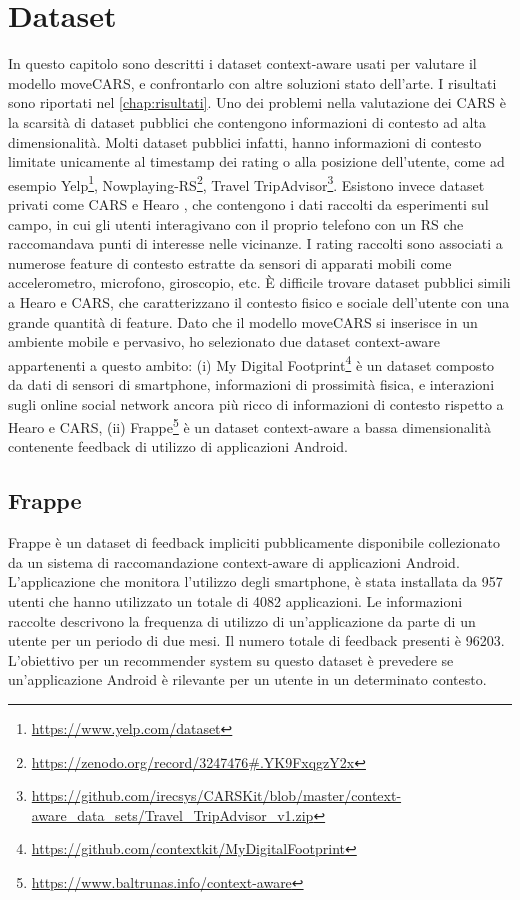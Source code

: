 \documentclass[12pt,italian]{report}
\begin{document}
\chapter{Dataset} \label{chap:datasets}
In questo capitolo sono descritti i dataset context-aware usati per valutare il modello moveCARS, e confrontarlo con altre soluzioni stato dell'arte. I risultati sono riportati nel \autoref{chap:risultati}. Uno dei problemi nella valutazione dei CARS è la scarsità di dataset pubblici che contengono informazioni di contesto ad alta dimensionalità. Molti dataset pubblici infatti, hanno informazioni di contesto limitate unicamente al timestamp dei rating o alla posizione dell'utente, come ad esempio Yelp\footnote{\url{https://www.yelp.com/dataset}}, Nowplaying-RS\footnote{\url{https://zenodo.org/record/3247476\#.YK9FxqgzY2x}}, Travel TripAdvisor\footnote{\url{https://github.com/irecsys/CARSKit/blob/master/context-aware_data_sets/Travel_TripAdvisor_v1.zip}}. Esistono invece dataset privati come CARS \cite{context-aware-deep-learning} e Hearo \cite{latent-context}, che contengono i dati raccolti da esperimenti sul campo, in cui gli utenti interagivano con il proprio telefono con un RS che raccomandava punti di interesse nelle vicinanze. I rating raccolti sono associati a numerose feature di contesto estratte da sensori di apparati mobili come accelerometro, microfono, giroscopio, etc.
\`E difficile trovare dataset pubblici simili a Hearo e CARS, che caratterizzano il contesto fisico e sociale dell'utente con una grande quantità di feature. Dato che il modello moveCARS si inserisce in un ambiente mobile e pervasivo, ho selezionato due dataset context-aware appartenenti a questo ambito: (i) My Digital Footprint\footnote{\url{https://github.com/contextkit/MyDigitalFootprint}} è un dataset composto da dati di sensori di smartphone, informazioni di prossimità fisica, e interazioni sugli online social network ancora più ricco di informazioni di contesto rispetto a Hearo e CARS, (ii) Frappe\footnote{\url{https://www.baltrunas.info/context-aware}} è un dataset context-aware a bassa dimensionalità contenente feedback di utilizzo di applicazioni Android.

\section{Frappe}
Frappe \cite{frappe} è un dataset di feedback impliciti pubblicamente disponibile collezionato da un sistema di raccomandazione context-aware di applicazioni Android. L'applicazione che monitora l'utilizzo degli smartphone, è stata installata da 957 utenti che hanno utilizzato un totale di 4082 applicazioni. Le informazioni raccolte descrivono la frequenza di utilizzo di un'applicazione da parte di un utente per un periodo di due mesi. Il numero totale di feedback presenti è 96203. L'obiettivo per un recommender system su questo dataset è prevedere se un'applicazione Android è rilevante per un utente in un determinato contesto.
\end{document}
